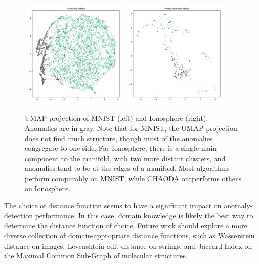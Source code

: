 \begin{figure}
   \centering
   \includegraphics[width=2in]{images/umaps/mnist-euclidean-umap2d.png}
   \includegraphics[width=2in]{images/umaps/ionosphere-euclidean-umap2d.png}
   \caption{UMAP projection of MNIST (left) and Ionosphere (right). Anomalies are in gray. Note that for MNIST, the UMAP projection does not find much structure, though most of the anomalies congregate to one side. For Ionosphere, there is a single main component to the manifold, with two more distant clusters, and anomalies tend to be at the edges of a manifold. Most algorithms perform comparably on MNIST, while CHAODA outperforms others on Ionosphere.}
   \label{fig:conclusions:umap-embeddings}
\end{figure}


The choice of distance function seems to have a significant impact on anomaly-detection performance.
In this case, domain knowledge is likely the best way to determine the distance function of choice.
Future work should explore a more diverse collection of domain-appropriate distance functions, such as Wasserstein distance on images, Levenshtein edit distance on strings, and Jaccard Index on the Maximal Common Sub-Graph of molecular structures.

